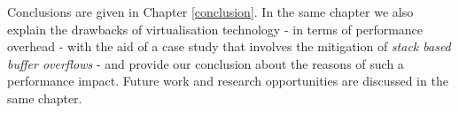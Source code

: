 Conclusions are given in Chapter \ref{conclusion}. In the same chapter we also explain the drawbacks of virtualisation technology - in terms of performance overhead - with the aid of a case study that involves the mitigation of \emph{stack based buffer overflows} - and provide our conclusion about the reasons of such a performance impact. Future work and research opportunities are discussed in the same chapter.


